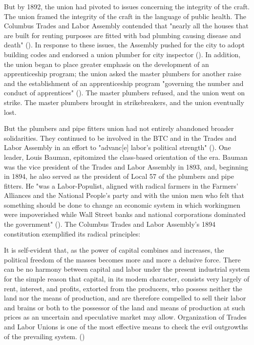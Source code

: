 \documentclass[12pt]{article}
\renewenvironment{quote}
  {\list{}{\leftmargin=\parindent\rightmargin=0pt}%
   \item\relax}
  {\endlist}
\begin{document}
But by 1892, the union had pivoted to issues concerning the integrity of the craft. The union framed the integrity of the craft in the language of public health. The Columbus Trades and Labor Assembly contended that "nearly all the houses that are built for renting purposes are fitted with bad plumbing causing disease and death" (\cite[47–48]{schneirovPrideSolidarityHistory1993}). In response to these issues, the Assembly pushed for the city to adopt building codes and endorsed a union plumber for city inspector (\citeyear[48]{schneirovPrideSolidarityHistory1993}). In addition, the union began to place greater emphasis on the development of an apprenticeship program; the union asked the master plumbers for another raise and the establishment of an apprenticeship program "governing the number and conduct of apprentices" (\citeyear[48]{schneirovPrideSolidarityHistory1993}). The master plumbers refused, and the union went on strike. The master plumbers brought in strikebreakers, and the union eventually lost.

But the plumbers and pipe fitters union had not entirely abandoned broader solidarities. They continued to be involved in the BTC and in the Trades and Labor Assembly in an effort to "advanc[e] labor’s political strength" (\cite[50]{schneirovPrideSolidarityHistory1993}). One leader, Louis Bauman, epitomized the class-based orientation of the era. Bauman was the vice president of the Trades and Labor Assembly in 1893, and, beginning in 1894, he also served as the president of Local 57 of the plumbers and pipe fitters. He "was a Labor-Populist, aligned with radical farmers in the Farmers’ Alliances and the National People’s party and with the union men who felt that something should be done to change an economic system in which workingmen were impoverished while Wall Street banks and national corporations dominated the government" (\citeyear[50]{schneirovPrideSolidarityHistory1993}). The Columbus Trades and Labor Assembly’s 1894 constitution exemplified its radical principles:

\begin{quote}
It is self-evident that, as the power of capital combines and increases, the political freedom of the masses becomes more and more a delusive force. There can be no harmony between capital and labor under the present industrial system for the simple reason that capital, in its modem character, consists very largely of rent, interest, and profits, extorted from the producers, who possess neither the land nor the means of production, and are therefore compelled to sell their labor and brains or both to the possessor of the land and means of production at such prices as an uncertain and speculative market may allow. Organization of Trades and Labor Unions is one of the most effective means to check the evil outgrowths of the prevailing system. (\cite[50]{schneirovPrideSolidarityHistory1993})
\end{quote}
\end{document}
